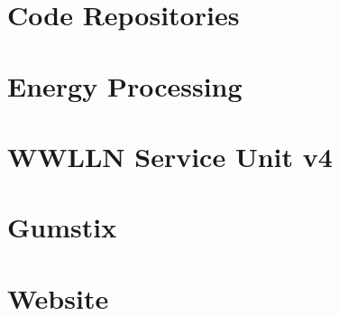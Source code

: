 \documentclass [11pt, twoside] {uwthesis}[2012/06/19]
\begin{document}
%
%

\appendix
\raggedbottom\sloppy


\chapter{Code Repositories}
\label{thesis:appendix:code}




\chapter{Energy Processing}
\label{thesis:appendix:energy}




\chapter{WWLLN Service Unit v4}
\label{thesis:appendix:su}




\chapter{Gumstix}
\label{thesis:appendix:gumstix}




\chapter{Website}
\label{thesis:appendix:website}



\end{document}
